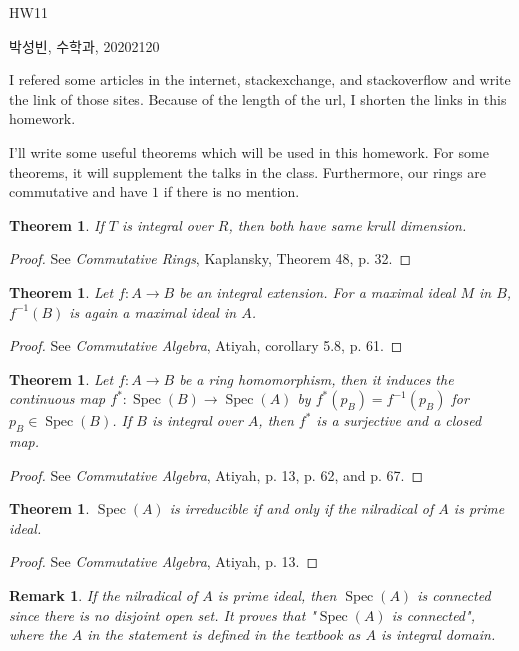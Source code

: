 \documentclass[a4paper, 12pt]{article}
\theoremstyle{Mydefinition}
\newtheorem{remark}[statement]{Remark}
\theoremstyle{Mytheorem}
\newtheorem{theorem}[statement]{Theorem}
\DeclareMathOperator{\Spec}{Spec}
\begin{document}
\thispagestyle{myfirstpage}
\begin{center}
	\Large{HW11}
\end{center}
박성빈, 수학과, 20202120

I refered some articles in the internet, stackexchange, and stackoverflow and write the link of those sites. Because of the length of the url, I shorten the links in this homework.

I'll write some useful theorems which will be used in this homework. For some theorems, it will supplement the talks in the class. Furthermore, our rings are commutative and have $1$ if there is no mention.
\begin{theorem}\label{HW11:TH:1}
If $T$ is integral over $R$, then both have same krull dimension.
\end{theorem}
\begin{proof}
See \textit{Commutative Rings}, Kaplansky, Theorem 48, p. 32.
\end{proof}
\begin{theorem}\label{HW11:TH:4}
Let $f:A\rightarrow B$ be an integral extension. For a maximal ideal $M$ in $B$, $f^{-1}(B)$ is again a maximal ideal in $A$.
\end{theorem}
\begin{proof}
See \textit{Commutative Algebra}, Atiyah, corollary 5.8, p. 61.
\end{proof}

\begin{theorem}\label{HW11:TH:2}
Let $f:A\rightarrow B$ be a ring homomorphism, then it induces the continuous map $f^*:\Spec(B)\rightarrow \Spec(A)$ by $f^*(p_B) = f^{-1}(p_B)$ for $p_B\in \Spec(B)$. If $B$ is integral over $A$, then $f^*$ is a surjective and a closed map.
\end{theorem}
\begin{proof}
See \textit{Commutative Algebra}, Atiyah, p. 13, p. 62, and p. 67.
\end{proof}
\begin{theorem}\label{HW11:TH:3}
$\Spec(A)$ is irreducible if and only if the nilradical of $A$ is prime ideal.
\end{theorem}
\begin{proof}
See \textit{Commutative Algebra}, Atiyah, p. 13.
\end{proof}
\begin{remark}\label{HW11:RM:1}
If the nilradical of $A$ is prime ideal, then $\Spec(A)$ is connected since there is no disjoint open set. It proves that "$\Spec(A)$ is connected", where the $A$ in the statement is defined in the textbook as $A$ is integral domain.
\end{remark}
\end{document}
